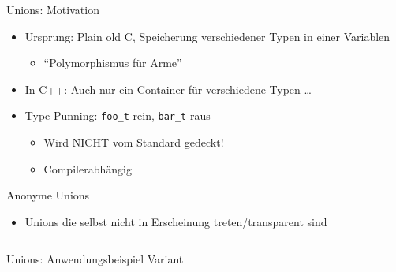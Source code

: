 \begin{frame}[fragile]{Unions: Motivation}
	\begin{itemize}
		\item Ursprung: Plain old C, Speicherung verschiedener Typen in einer Variablen
		\begin{itemize}
			\item \enquote{Polymorphismus für Arme}
		\end{itemize}
		\pause
		\item In C++: Auch nur ein Container für verschiedene Typen \dots
		\pause
		\item Type Punning: \verb|foo_t| rein, \verb|bar_t| raus
		\begin{itemize}
			\item Wird NICHT vom Standard gedeckt!
			\item Compilerabhängig
		\end{itemize}
	\end{itemize}
\end{frame}

\begin{frame}[fragile]{Anonyme Unions}
	\begin{itemize}
		\item Unions die selbst nicht in Erscheinung treten/transparent sind
	\end{itemize}
	\begin{columns}
			
			
			
	\end{columns}
\end{frame}

\begin{frame}[fragile]{Unions: Anwendungsbeispiel Variant}
	
\end{frame}

